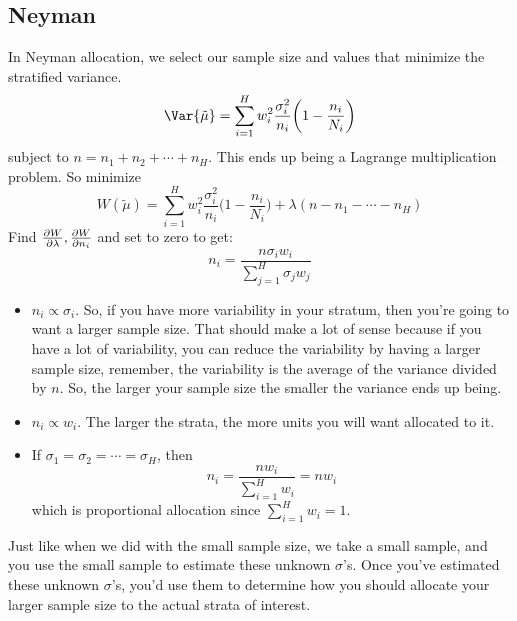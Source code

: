 \subsection*{Neyman}
In Neyman allocation, we select our sample size and values that minimize the stratified variance.
\[ \Var{\tilde{\mu}}=\sum_{i=1}^{H} w_i^2 \frac{\sigma_i^2}{n_i} \biggl(1-\frac{n_i}{N_i} \biggr) \]
subject to $ n=n_1+n_2+\cdots+n_H $. This ends up being a Lagrange multiplication problem.
So minimize
\[ W(\tilde{\mu})=\sum_{i=1}^{H} w_i^2 \frac{\sigma_i^2}{n_i} \biggl(1-\frac{n_i}{N_i} \biggr)+
    \lambda(n-n_1-\cdots-n_H) \]
Find $ \pdv{W}{\lambda},\pdv{W}{n_i} $ and set to zero to get:
\[ n_i=\frac{n\sigma_i w_i}{\sum_{j=1}^{H} \sigma_j w_j}  \]
\begin{Remark}{}{}
    \begin{itemize}
        \item $ n_i \propto \sigma_i $. So, if you have more variability in your stratum,
              then you're going to want a larger sample size. That should make a lot of
              sense because if you have a lot of variability, you can reduce the variability
              by having a larger sample size, remember, the variability
              is the average of the variance divided by $ n $.
              So, the larger your sample size the smaller the variance ends up being.
        \item $ n_i\propto w_i $. The larger the strata, the more
              units you will want allocated to it.
        \item If $ \sigma_1=\sigma_2=\cdots=\sigma_H $, then
              \[ n_i=\frac{n w_i}{\sum_{i=1}^{H} w_i}=n w_i  \]
              which is proportional allocation since $ \sum_{i=1}^{H} w_i=1 $.
    \end{itemize}
\end{Remark}
Just like when we did with the small sample size, we take a small sample, and you use the small sample
to estimate these unknown $ \sigma $'s. Once you've estimated these unknown $ \sigma $'s,
you'd use them to determine how you should allocate your larger sample size to the actual strata of interest.
